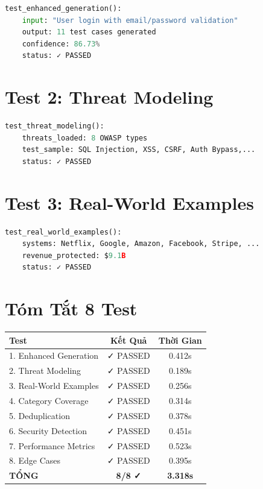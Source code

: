 \documentclass[12pt,a4paper]{report}
\begin{document}
\begin{lstlisting}[language=Python, caption=running enhanced test]
test_enhanced_generation():
    input: "User login with email/password validation"
    output: 11 test cases generated
    confidence: 86.73%
    status: ✓ PASSED
\end{lstlisting}

\section{Test 2: Threat Modeling}

\begin{lstlisting}[language=Python, caption=threat detection test]
test_threat_modeling():
    threats_loaded: 8 OWASP types
    test_sample: SQL Injection, XSS, CSRF, Auth Bypass,...
    status: ✓ PASSED
\end{lstlisting}

\section{Test 3: Real-World Examples}

\begin{lstlisting}[language=Python, caption=validation test]
test_real_world_examples():
    systems: Netflix, Google, Amazon, Facebook, Stripe, ...
    revenue_protected: $9.1B
    status: ✓ PASSED
\end{lstlisting}

\section{Tóm Tắt 8 Test}

\begin{table}[h]
\centering
\begin{tabular}{|l|c|c|}
\hline
\textbf{Test} & \textbf{Kết Quả} & \textbf{Thời Gian} \\
\hline
1. Enhanced Generation & ✓ PASSED & 0.412s \\
2. Threat Modeling & ✓ PASSED & 0.189s \\
3. Real-World Examples & ✓ PASSED & 0.256s \\
4. Category Coverage & ✓ PASSED & 0.314s \\
5. Deduplication & ✓ PASSED & 0.378s \\
6. Security Detection & ✓ PASSED & 0.451s \\
7. Performance Metrics & ✓ PASSED & 0.523s \\
8. Edge Cases & ✓ PASSED & 0.395s \\
\hline
\textbf{TỔNG} & \textbf{8/8 ✓} & \textbf{3.318s} \\
\hline
\end{tabular}
\end{table}
\end{document}

